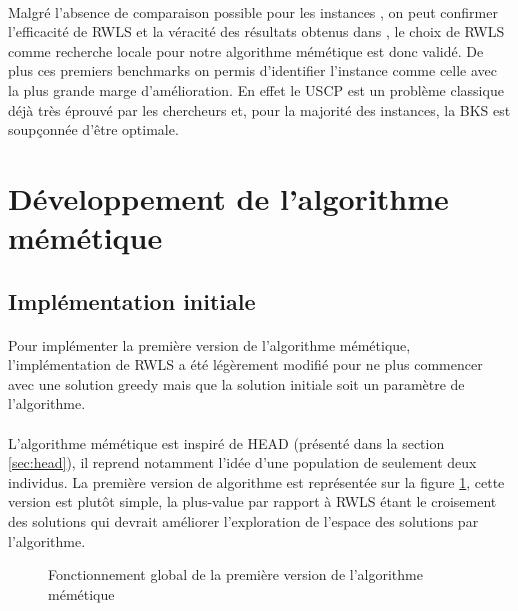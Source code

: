 \documentclass[a4paper,11pt,twoside,french,report]{../common/simplem}
\begin{document}
				\paragraph*{}
					Malgré l'absence de comparaison possible pour les instances , on peut confirmer l'efficacité de \gls{RWLS} et la véracité des résultats obtenus dans \cite{Gao2015}, le choix de \gls{RWLS} comme recherche locale pour notre algorithme mémétique est donc validé. De plus ces premiers benchmarks on permis d'identifier l'instance  comme celle avec la plus grande marge d'amélioration. En effet le \gls{USCP} est un problème classique déjà très éprouvé par les chercheurs et, pour la majorité des instances, la \gls{BKS} est soupçonnée d'être optimale.
		\section{Développement de l'algorithme mémétique}\label{sec:memetic_algorithm}
			\subsection{Implémentation initiale}
				\paragraph*{}
					Pour implémenter la première version de l'algorithme mémétique, l'implémentation de \gls{RWLS} a été légèrement modifié pour ne plus commencer avec une solution greedy mais que la solution initiale soit un paramètre de l'algorithme.
				\paragraph*{}
					L'algorithme mémétique est inspiré de \gls{HEAD} (présenté dans la section \ref{sec:head}), il reprend notamment l'idée d'une population de seulement deux individus. La première version de algorithme est représentée sur la figure \ref{fig:memetic_algorithm_v1}, cette version est plutôt simple, la plus-value par rapport à \gls{RWLS} étant le croisement des solutions qui devrait améliorer l'exploration de l'espace des solutions par l'algorithme.
				\begin{figure}[H]
					\centering%
					\caption{Fonctionnement global de la première version de l'algorithme mémétique}%
					\label{fig:memetic_algorithm_v1}%
				\end{figure}
\end{document}
